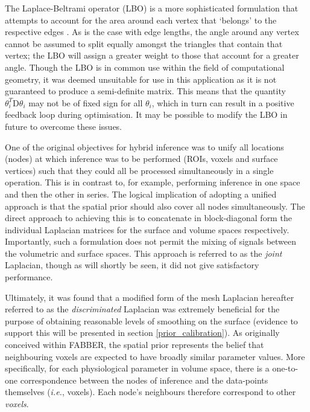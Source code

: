 \documentclass[12pt]{report}
\newcommand{\mat}[1]{\mathrm{#1}}
\begin{document}
The Laplace-Beltrami operator (LBO) is a more sophisticated formulation that attempts to account for the area around each vertex that `belongs' to the respective edges \cite{Meyer2003}. As is the case with edge lengths, the angle around any vertex cannot be assumed to split equally amongst the triangles that contain that vertex; the LBO will assign a greater weight to those that account for a greater angle. Though the LBO is in common use within the field of computational geometry, it was deemed unsuitable for use in this application as it is not guaranteed to produce a semi-definite matrix. This means that the quantity $\theta_i^T \mat{D} \theta_i$ may not be of fixed sign for all $\theta_i$, which in turn can result in a positive feedback loop during optimisation. It may be possible to modify the LBO in future to overcome these issues. 

One of the original objectives for hybrid inference was to unify all locations (nodes) at which inference was to be performed (ROIs, voxels and surface vertices) such that they could all be processed simultaneously in a single operation. This is in contrast to, for example, performing inference in one space and then the other in series. The logical implication of adopting a unified approach is that the spatial prior should also cover all nodes simultaneously. The direct approach to achieving this is to concatenate in block-diagonal form the individual Laplacian matrices for the surface and volume spaces respectively. Importantly, such a formulation does not permit the mixing of signals between the volumetric and surface spaces. This approach is referred to as the \textit{joint} Laplacian, though as will shortly be seen, it did not give satisfactory performance. 

Ultimately, it was found that a modified form of the mesh Laplacian hereafter referred to as the \textit{discriminated} Laplacian was extremely beneficial for the purpose of obtaining reasonable levels of smoothing on the surface (evidence to support this will be presented in section \ref{prior_calibration}). As originally conceived within FABBER, the spatial prior represents the belief that neighbouring voxels are expected to have broadly similar parameter values. More specifically, for each physiological parameter in volume space, there is a one-to-one correspondence between the nodes of inference and the data-points themselves (\textit{i.e.}, voxels). Each node's neighbours therefore correspond to other \textit{voxels}. 
\end{document}
